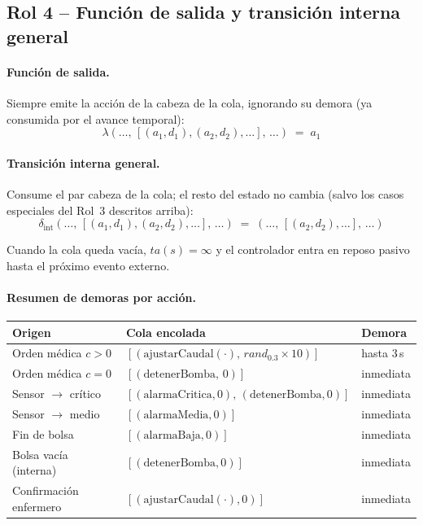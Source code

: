 \documentclass{article}
\begin{document}
\subsection{Rol 4 – Función de salida y transición interna general}

\paragraph{Función de salida.}
Siempre emite la acción de la cabeza de la cola, ignorando su demora
(ya consumida por el avance temporal):
\[
  \lambda(\ldots,\,[(a_1,d_1),(a_2,d_2),\ldots],\,\ldots) \;=\; a_1
\]

\paragraph{Transición interna general.}
Consume el par cabeza de la cola; el resto del estado no cambia
(salvo los casos especiales del Rol~3 descritos arriba):
\[
  \delta_{\mathrm{int}}(\ldots,\,[(a_1,d_1),(a_2,d_2),\ldots],\,\ldots)
  \;=\; (\ldots,\,[(a_2,d_2),\ldots],\,\ldots)
\]

Cuando la cola queda vacía, $ta(s) = \infty$ y el controlador entra en
reposo pasivo hasta el próximo evento externo.

\paragraph{Resumen de demoras por acción.}

\begin{center}
\begin{tabular}{lll}
\toprule
Origen & Cola encolada & Demora \\
\midrule
Orden médica $c > 0$   & $[(\mathrm{ajustarCaudal}(\cdot),\, \mathit{rand}_{0.3}\times 10)]$ & hasta 3\,s \\
Orden médica $c = 0$   & $[(\mathrm{detenerBomba},\,0)]$                                      & inmediata \\
Sensor $\to$ crítico   & $[(\mathrm{alarmaCritica},0),\,(\mathrm{detenerBomba},0)]$           & inmediata \\
Sensor $\to$ medio     & $[(\mathrm{alarmaMedia},0)]$                                         & inmediata \\
Fin de bolsa           & $[(\mathrm{alarmaBaja},0)]$                                          & inmediata \\
Bolsa vacía (interna)  & $[(\mathrm{detenerBomba},0)]$                                        & inmediata \\
Confirmación enfermero & $[(\mathrm{ajustarCaudal}(\cdot),0)]$                                & inmediata \\
\bottomrule
\end{tabular}
\end{center}
\end{document}
